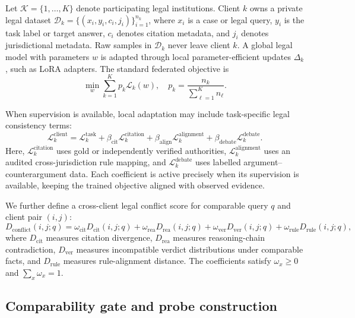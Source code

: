 \documentclass[a4paper,fleqn]{cas-sc}
\newcommand{\client}{\mathcal{K}}
\newcommand{\dataset}{\mathcal{D}}
\newcommand{\loss}{\mathcal{L}}
\begin{document}
Let $\client=\{1,\ldots,K\}$ denote participating legal institutions. Client $k$ owns a private legal dataset $\dataset_k=\{(x_i,y_i,c_i,j_i)\}_{i=1}^{n_k}$, where $x_i$ is a case or legal query, $y_i$ is the task label or target answer, $c_i$ denotes citation metadata, and $j_i$ denotes jurisdictional metadata. Raw samples in $\dataset_k$ never leave client $k$. A global legal model with parameters $w$ is adapted through local parameter-efficient updates $\Delta_k$, such as LoRA adapters. The standard federated objective is
\begin{equation}
    \min_w \sum_{k=1}^{K} p_k \loss_k(w), \quad p_k=\frac{n_k}{\sum_{\ell=1}^{K} n_\ell}.
\end{equation}

When supervision is available, local adaptation may include task-specific legal consistency terms:
\begin{equation}
    \loss^{\mathrm{client}}_k =
    \loss^{\mathrm{task}}_k
    + \beta_{\mathrm{cit}}\loss^{\mathrm{citation}}_k
    + \beta_{\mathrm{align}}\loss^{\mathrm{alignment}}_k
    + \beta_{\mathrm{debate}}\loss^{\mathrm{debate}}_k .
\end{equation}
Here, $\loss^{\mathrm{citation}}_k$ uses gold or independently verified authorities, $\loss^{\mathrm{alignment}}_k$ uses an audited cross-jurisdiction rule mapping, and $\loss^{\mathrm{debate}}_k$ uses labelled argument--counterargument data. Each coefficient is active precisely when its supervision is available, keeping the trained objective aligned with observed evidence.

We further define a cross-client legal conflict score for comparable query $q$ and client pair $(i,j)$:
\begin{equation}
    D_{\mathrm{conflict}}(i,j;q) =
    \omega_{\mathrm{cit}}D_{\mathrm{cit}}(i,j;q)
    + \omega_{\mathrm{rea}}D_{\mathrm{rea}}(i,j;q)
    + \omega_{\mathrm{ver}}D_{\mathrm{ver}}(i,j;q)
    + \omega_{\mathrm{rule}}D_{\mathrm{rule}}(i,j;q),
\end{equation}
where $D_{\mathrm{cit}}$ measures citation divergence, $D_{\mathrm{rea}}$ measures reasoning-chain contradiction, $D_{\mathrm{ver}}$ measures incompatible verdict distributions under comparable facts, and $D_{\mathrm{rule}}$ measures rule-alignment distance.
The coefficients satisfy $\omega_x\geq 0$ and $\sum_x \omega_x=1$.

\subsection{Comparability gate and probe construction}
\end{document}
